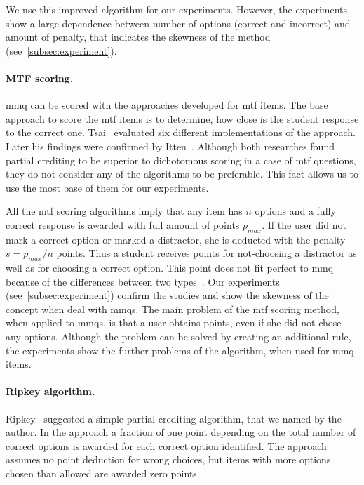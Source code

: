 \documentclass[PhD, Submit, ngerman,UKenglish,table]{scrbook}
\begin{document}
We use this improved algorithm for our experiments.
However, the experiments show a large dependence between number of options (correct and incorrect) and amount of penalty, that indicates the skewness of the method (see~\autoref{subsec:experiment}).

\paragraph{MTF scoring.}

\gls{mmq} can be scored with the approaches developed for \gls{mtf} items.
The base approach to score the \gls{mtf} items is to determine, how close is the student response to the correct one.
Tsai~\cite{Tsai1993} evaluated six different implementations of the approach.
Later his findings were confirmed by Itten~\cite{Itten1997}.
Although both researches found partial crediting to be superior to dichotomous scoring in a case of \gls{mtf} questions, they do not consider any of the algorithms to be preferable. 
This fact allows us to use the most base of them for our experiments.

All the \gls{mtf} scoring algorithms imply that any item has $n$ options and a fully correct response is awarded with full amount of points $p_{max}$.
If the user did not mark a correct option or marked a distractor, she is deducted with the penalty $s = p_{max}/n$ points.
Thus a student receives points for not-choosing a distractor as well as for choosing a correct option.
This point does not fit perfect to \gls{mmq} because of the differences between two types~\cite{Pomplun1997,Cronbach,Frisbie1992}.
Our experiments (see~\autoref{subsec:experiment}) confirm the studies and show the skewness of the concept when deal with \gls{mmq}s.
The main problem of the \gls{mtf} scoring method, when applied to \gls{mmq}s, is that a user obtains points, even if she did not chose any options. 
Although the problem can be solved by creating an additional rule,
the experiments show the further problems of the algorithm, when used for \gls{mmq} items. 


\paragraph{Ripkey algorithm.}

Ripkey~\cite{Ripkey1996} suggested a simple partial crediting algorithm, that we named by the author.
In the approach a fraction of one point depending on the total number of correct options is awarded for each correct option identified.
The approach assumes no point deduction for wrong choices, but items with more options chosen than allowed are awarded zero points.
\end{document}
